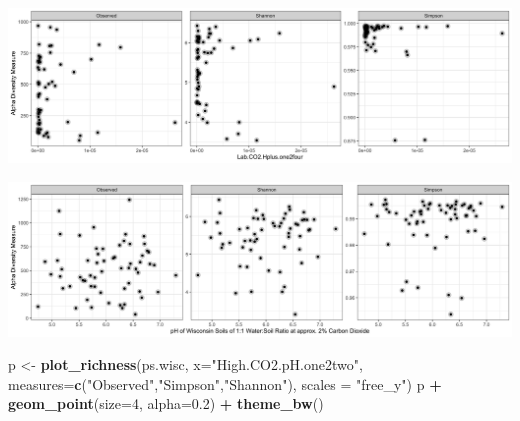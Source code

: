 \documentclass[]{article}
\newenvironment{Shaded}{\begin{snugshade}}{\end{snugshade}}
\newcommand{\DataTypeTok}[1]{\textcolor[rgb]{0.13,0.29,0.53}{#1}}
\newcommand{\DecValTok}[1]{\textcolor[rgb]{0.00,0.00,0.81}{#1}}
\newcommand{\FloatTok}[1]{\textcolor[rgb]{0.00,0.00,0.81}{#1}}
\newcommand{\KeywordTok}[1]{\textcolor[rgb]{0.13,0.29,0.53}{\textbf{#1}}}
\newcommand{\NormalTok}[1]{#1}
\newcommand{\OperatorTok}[1]{\textcolor[rgb]{0.81,0.36,0.00}{\textbf{#1}}}
\newcommand{\StringTok}[1]{\textcolor[rgb]{0.31,0.60,0.02}{#1}}
\begin{document}
\includegraphics{output-rmd/richness-ph-Lab.CO2.Hplus.one2four.spoon-1.png}

\begin{Shaded}
\end{Shaded}

\includegraphics{output-rmd/richness-ph-High.CO2.pH.one2one.wisc-1.png}

\begin{Shaded}
\begin{Highlighting}[]
\NormalTok{p <-}\StringTok{ }\KeywordTok{plot_richness}\NormalTok{(ps.wisc, }\DataTypeTok{x=}\StringTok{"High.CO2.pH.one2two"}\NormalTok{, }\DataTypeTok{measures=}\KeywordTok{c}\NormalTok{(}\StringTok{"Observed"}\NormalTok{,}\StringTok{"Simpson"}\NormalTok{,}\StringTok{"Shannon"}\NormalTok{), }\DataTypeTok{scales =} \StringTok{"free_y"}\NormalTok{)}
\NormalTok{p }\OperatorTok{+}\StringTok{ }\KeywordTok{geom_point}\NormalTok{(}\DataTypeTok{size=}\DecValTok{4}\NormalTok{, }\DataTypeTok{alpha=}\FloatTok{0.2}\NormalTok{) }\OperatorTok{+}\StringTok{ }\KeywordTok{theme_bw}\NormalTok{()}
\end{Highlighting}
\end{Shaded}
\end{document}
